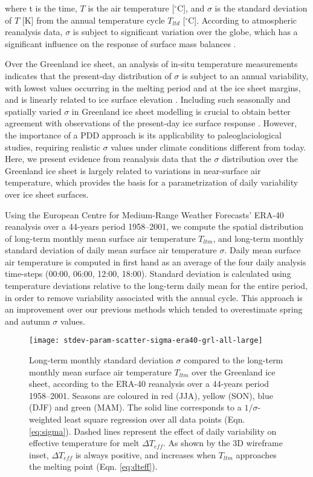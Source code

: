 \documentclass[review]{igs}
\begin{document}
where t is the time, $T$ is the air temperature [$^\circ$C], and $\sigma$ is the standard deviation of $T$ [K] from the annual temperature cycle $T_{ltd}$ [$^\circ$C]. According to atmospheric reanalysis data, $\sigma$ is subject to significant variation over the globe, which has a significant influence on the response of surface mass balances \citep{seguinot-2013}.

Over the Greenland ice sheet, an analysis of in-situ temperature measurements indicates that the present-day distribution of $\sigma$ is subject to an annual variability, with lowest values occurring in the melting period and at the ice sheet margins, and is linearly related to ice surface elevation \citep{fausto-etal-2009,fausto-etal-2011}. Including such seasonally and spatially varied $\sigma$ in Greenland ice sheet modelling is crucial to obtain better agreement with observations of the present-day ice surface response \citep{rogozhina-rau-inpress}. However, the importance of a PDD approach is its applicability to paleoglaciological studies, requiring realistic $\sigma$ values under climate conditions different from today. Here, we present evidence from reanalysis data that the $\sigma$ distribution over the Greenland ice sheet is largely related to variations in near-surface air temperature, which provides the basis for a parametrization of daily variability over ice sheet surfaces.

Using the European Centre for Medium-Range Weather Forecasts’ ERA-40 reanalysis \citep{uppala-etal-2005} over a 44-years period 1958--2001, we compute the spatial distribution of long-term monthly mean surface air temperature $T_{ltm}$, and long-term monthly standard deviation of daily mean surface air temperature $\sigma$. Daily mean surface air temperature is computed in first hand as an average of the four daily analysis time-steps (00:00, 06:00, 12:00, 18:00). Standard deviation is calculated using temperature deviations relative to the long-term daily mean for the entire period, in order to remove variability associated with the annual cycle. This approach is an improvement over our previous methods \citep{seguinot-2013,rogozhina-rau-inpress} which tended to overestimate spring and autumn $\sigma$ values.

\begin{figure*}
    \centering\texttt{[image: stdev-param-scatter-sigma-era40-grl-all-large]}
    \caption{Long-term monthly standard deviation $\sigma$ compared to the long-term monthly mean surface air temperature $T_{ltm}$ over the Greenland ice sheet, according to the ERA-40 reanalysis \citep{uppala-etal-2005} over a 44-years period 1958–2001. Seasons are coloured in red (JJA), yellow (SON), blue (DJF) and green (MAM). The solid line corresponds to a $1/\sigma$-weighted least square regression over all data points (Eqn. \ref{eq:sigma}). Dashed lines represent the effect of daily variability on effective temperature for melt $\Delta T_{eff}$. As shown by the 3D wireframe inset, $\Delta T_{eff}$ is always positive, and increases when $T_{ltm}$ approaches the melting point (Eqn. \ref{eq:dteff}).}
    \label{fig:grl}
\end{figure*}
\end{document}
